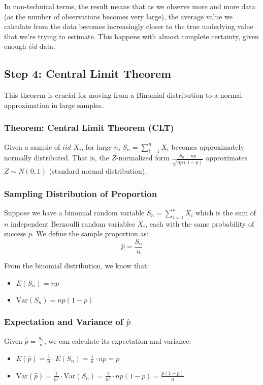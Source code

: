 \documentclass[11pt]{article}
\begin{document}
In non-technical terms, the result means that as we observe more and more data (as the number of observations becomes very large), the average value we calculate from the data becomes increasingly closer to the true underlying value that we're trying to estimate. This happens with almost complete certainty, given enough $iid$ data.

\subsection*{Step 4: Central Limit Theorem}

This theorem is crucial for moving from a Binomial distribution to a normal approximation in large samples.

\subsubsection*{Theorem: Central Limit Theorem (CLT)}
Given a sample of $iid$ $X_i$, for large \(n\), \(S_n	=\sum_{i=1}^{n}X_i\) becomes approximately normally distributed. That is, the $Z$-normalized form \(\frac{S_n - np}{\sqrt{np(1-p)}}\) approximates \(Z \sim N(0, 1)\) (standard normal distribution).


\subsubsection*{Sampling Distribution of Proportion}

Suppose we have a binomial random variable \( S_n = \sum_{i=1}^n X_i \) which is the sum of \( n \) independent Bernoulli random variables \( X_i \), each with the same probability of success \( p \). We define the sample proportion as:
\[ \hat{p} = \frac{S_n}{n} \]

From the binomial distribution, we know that:
\begin{itemize}
    \item \( E(S_n) = np \) 
    \item \( \text{Var}(S_n) = np(1-p) \)
\end{itemize}


\subsubsection*{Expectation and Variance of \( \hat{p} \)}
Given \( \hat{p} = \frac{S_n}{n} \), we can calculate its expectation and variance:
\begin{itemize}
    \item \( E(\hat{p}) = \frac{1}{n} \cdot E(S_n) = \frac{1}{n} \cdot np = p \)
    \item \( \text{Var}(\hat{p}) = \frac{1}{n^2} \cdot \text{Var}(S_n) = \frac{1}{n^2} \cdot np(1-p) = \frac{p(1-p)}{n} \)
\end{itemize}
\end{document}
